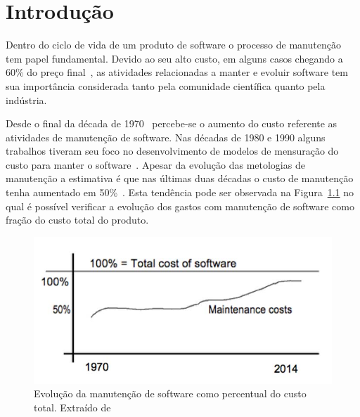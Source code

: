 \chapter{Introdução}
\label{ch:intro}

Dentro do ciclo de vida de um produto de software o processo de manutenção tem
papel fundamental. Devido ao seu alto custo, em alguns casos chegando a 60\% do
preço final~\cite{kaur2015review}, as atividades relacionadas a manter e evoluir
software tem sua importância considerada tanto pela comunidade científica quanto
pela indústria.

Desde o final da década de 1970~\cite{Zelkowitz:1979:PSE:578504} percebe-se o
aumento do custo referente as atividades de  manutenção de software. Nas décadas
de 1980 e 1990 alguns trabalhos tiveram seu foco no desenvolvimento de modelos
de mensuração do custo para manter o
software~\cite{Herrin:1985:SMC:323287.323383,hirota1994approach}. Apesar da
evolução das metologias de manutenção a estimativa é que nas últimas duas
décadas o custo de manutenção tenha aumentado em
50\%~\cite{koskinen2010software}. Esta tendência pode ser observada na
Figura~\ref{fig:software-maintence-costs} no qual é possível verificar a
evolução dos gastos com manutenção de software como fração do custo total do
produto.

\begin{figure}[htpb]
\centering
\includegraphics[width=0.7\linewidth]
				{./chapter-intro/img/software-maintence-costs}
\caption{Evolução da manutenção de software como percentual do custo total.
	Extraído de~\cite{engelbertink2010save}}
\label{fig:software-maintence-costs}
\end{figure}

